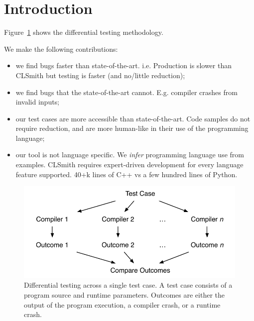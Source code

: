 \section{Introduction}\label{sec:intro}

Figure~\ref{fig:difftest} shows the differential testing methodology.

We make the following contributions:
%
\begin{itemize}
\item we find bugs faster than state-of-the-art. i.e. Production is slower than CLSmith but testing is faster (and no/little reduction);
\item we find bugs that the state-of-the-art cannot. E.g. compiler crashes from invalid inputs;
\item our test cases are more accessible than state-of-the-art. Code samples do not require reduction, and are more human-like in their use of the programming language;
\item our tool is not language specific. We \emph{infer} programming language use from examples. CLSmith requires expert-driven development for every language feature supported. 40+k lines of C++ vs a few hundred lines of Python.
\end{itemize}

\begin{figure}
  \centering
  \includegraphics[width=.9\columnwidth]{img/difftest} %
  \caption{%
    Differential testing across a single test case. A test case consists of a program source and runtime parameters. Outcomes are either the output of the program execution, a compiler crash, or a runtime crash.%
  }%
  \label{fig:difftest}
\end{figure}